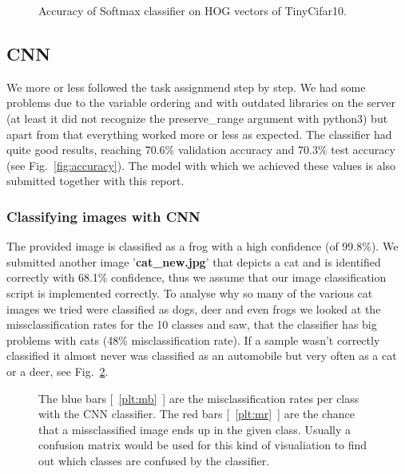 \begin{figure}[h!t]
\newcommand{\plotref}[1]{{[~\ref{plt:#1}~]}}
\centering
\caption{Accuracy of Softmax classifier on HOG vectors of TinyCifar10. } %
\label{figparam-opt-hog6}
\end{figure}




\subsection{CNN}
We more or less followed the task assignmend step by step. We had some problems due to the variable ordering and with outdated libraries on the server (at least it did not recognize the preserve\_range argument with python3) but apart from that everything worked more or less as expected. The classifier had quite good results, reaching 70.6\% validation accuracy and 70.3\% test accuracy (see Fig.~\ref{fig:accuracy}). The model with which we achieved these values is also submitted together with this report.

\subsubsection{Classifying images with CNN}
The provided image is classified as a frog with a high confidence (of 99.8\%). We submitted another image '\textbf{cat\_new.jpg}' that depicts a cat and is identified correctly with 68.1\% confidence, thus we assume that our image classification script is implemented correctly.
To analyse why so many of the various cat images we tried were classified as dogs, deer and even frogs we looked at the missclassification rates for the 10 classes and saw, that the classifier has big problems with cats (48\% misclassification rate). If a sample wasn't correctly classified it almost never was classified as an automobile but very often as a cat or a deer, see Fig.~\ref{fig:missrate}.

\begin{figure}[h!t]
\newcommand{\plotref}[1]{{[~\ref{plt:#1}~]}}
\centering
\caption{The  blue bars \plotref{mb} are the misclassification rates per class with the CNN classifier. The red bars \plotref{mr} are the chance that a missclassified image ends up in the given class. Usually a confusion matrix would be used for this kind of visualiation to find out which classes are confused by the classifier.} %
\label{fig:missrate}

\end{figure}



